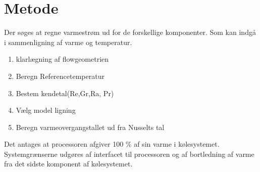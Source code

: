 \section{Metode}

Der søges at regne varmestrøm ud for de forskellige komponenter. Som kan indgå i sammenligning af varme og temperatur.

\begin{enumerate}
	\item klarlægning af flowgeometrien
	\item Beregn Referencetemperatur
	\item Bestem kendetal(Re,Gr,Ra, Pr)
	\item Vælg model ligning
	\item Beregn varmeovergangstallet ud fra Nusselts tal
\end{enumerate}

Det antages at processoren afgiver 100 \% af sin varme i kølesystemet.
Systemgrænserne udgøres af interfacet til processoren og af bortledning af varme fra det sidste komponent af kølesystemet.
